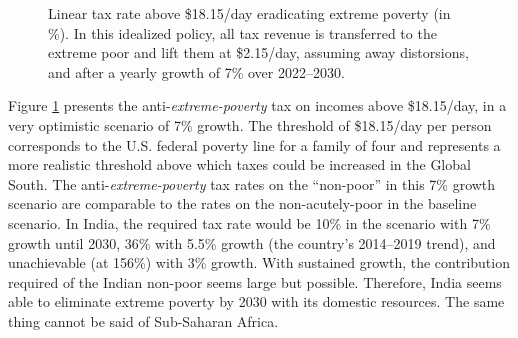 \begin{figure}[b!]
  \caption[Anti-\textit{extreme-poverty} tax above \$18.15/day in 2030 after 3\% growth.]{Linear tax rate above \$18.15/day eradicating extreme poverty (in \%). In this idealized policy, all tax revenue is transferred to the extreme poor and lift them at \$2.15/day, assuming away distorsions, and after a yearly growth of 7\% over 2022--2030.
  }\label{fig:antipoverty_tax_18}
\end{figure}

Figure \ref{fig:antipoverty_tax_18} presents the anti-\textit{extreme-poverty} tax on incomes above \$18.15/day, in a very optimistic scenario of 7\% growth. The threshold of \$18.15/day per person corresponds to the U.S. federal poverty line for a family of four and represents a more realistic threshold above which taxes could be increased in the Global South. The anti-\textit{extreme-poverty} tax rates on the ``non-poor'' %
in this 7\% growth scenario are comparable to the rates on the non-acutely-poor in the baseline scenario. In India, the required tax rate would be 10\% %
in the scenario with 7\% growth until 2030, 36\% with 5.5\% growth (the country's 2014--2019 trend), and unachievable (at 156\%) with 3\% growth. %
With sustained growth, the contribution required of the Indian non-poor seems large but possible. %
Therefore, India seems able to eliminate extreme poverty by 2030 with its domestic resources. The same thing cannot be said of Sub-Saharan Africa. %

